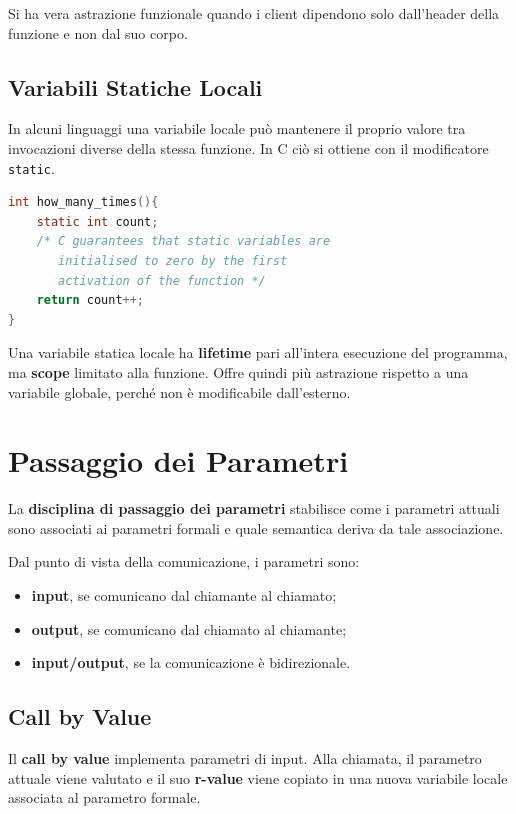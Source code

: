 \documentclass{article}
\begin{document}
Si ha vera astrazione funzionale quando i client dipendono solo dall'header della funzione e non dal suo corpo.

\subsection{Variabili Statiche Locali}

In alcuni linguaggi una variabile locale può mantenere il proprio valore tra invocazioni diverse della stessa funzione. In C ciò si ottiene con il modificatore \texttt{static}.

\begin{lstlisting}[language=C]
int how_many_times(){
    static int count;
    /* C guarantees that static variables are
       initialised to zero by the first
       activation of the function */
    return count++;
}
\end{lstlisting}

Una variabile statica locale ha \textbf{lifetime} pari all'intera esecuzione del programma, ma \textbf{scope} limitato alla funzione. Offre quindi più astrazione rispetto a una variabile globale, perché non è modificabile dall'esterno.

\section{Passaggio dei Parametri}

La \textbf{disciplina di passaggio dei parametri} stabilisce come i parametri attuali sono associati ai parametri formali e quale semantica deriva da tale associazione.

Dal punto di vista della comunicazione, i parametri sono:
\begin{itemize}
  \item \textbf{input}, se comunicano dal chiamante al chiamato;
  \item \textbf{output}, se comunicano dal chiamato al chiamante;
  \item \textbf{input/output}, se la comunicazione è bidirezionale.
\end{itemize}

\subsection{Call by Value}

Il \textbf{call by value} implementa parametri di input. Alla chiamata, il parametro attuale viene valutato e il suo \textbf{r-value} viene copiato in una nuova variabile locale associata al parametro formale.
\end{document}
